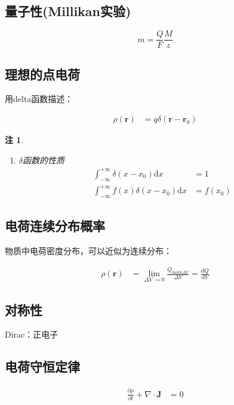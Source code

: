\documentclass[12pt,onecolumn,a4paper]{book}
\newtheorem*{note}{注}
\numberwithin{table}{subsection}
\numberwithin{equation}{subsection}
\begin{document}
\subsection{量子性(Millikan实验)}

$$
    m = \frac{Q}{F} \frac{M}{z}
$$

\subsection{理想的点电荷}

用delta函数描述：

\begin{align}
    \rho(\mathbf{r}) & = q \delta(\mathbf{r} - \mathbf{r}_0)
\end{align}

\begin{note}
    \begin{enumerate}
        \item $\delta$函数的性质
              \begin{align}
                  \int_{-\infty}^{+\infty} \delta(x - x_0) \mathrm{d} x     & = 1      \\
                  \int_{-\infty}^{+\infty} f(x)\delta(x - x_0) \mathrm{d} x & = f(x_0)
              \end{align}
    \end{enumerate}
\end{note}

\subsection{电荷连续分布概率}

物质中电荷密度分布，可以近似为连续分布：

\begin{align}
    \rho(\mathbf{r}) & = \lim_{\Delta V \to 0} \frac{Q_{\text{inside}\Delta V}}{\Delta V} = \frac{\mathrm{d} Q}{\mathrm{d} V}
\end{align}

\subsection{对称性}

Dirac：正电子

\subsection{电荷守恒定律}

\begin{align}
    \frac{\partial \rho}{\partial t} + \nabla \cdot \mathbf{J} & = 0
\end{align}
\end{document}
